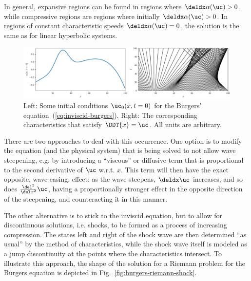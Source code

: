 In general, expansive regions can be found in regions where $\deldx \alpha(\uc)
> 0$, while compressive regions are regions where initially $\deldx \alpha(\uc) > 0$. In regions of
constant characteristic speeds $\deldx \alpha(\uc) = 0$, the solution is the same as for linear
hyperbolic systems.




\begin{figure}[H]
    \centering
    \includegraphics[width=\linewidth]{./figures/FV/burgers_characteristics.pdf}%
    \caption[Characteristics for the Burgers equation]{
    Left: Some initial conditions $\uc_0(x, t=0)$ for the Burgers'
equation~(\ref{eq:inviscid-burgers}). Right: The corresponding characteristics that satisfy
$\DDT{x} = \uc$. All units are arbitrary.
}
    \label{fig:burgers-characteristics}
\end{figure}


There are two approaches to deal with this occurrence. One option is to modify the equation (and
the physical system) that is being solved to not allow wave steepening, e.g. by introducing a
``viscous'' or diffusive term that is proportional to the second derivative of $\uc$ w.r.t. $x$.
This term will then have the exact opposite, wave-easing, effect: as the wave steepens, $\deldx
\uc$ increases, and so does $\frac{\del^2}{\del x^2} \uc$, having a proportionally stronger effect
in the opposite direction of the steepening, and counteracting it in this manner.

The other alternative is to stick to the inviscid equation, but to allow for discontinuous
solutions, i.e. shocks, to be formed as a process of increasing compression. The states left and
right of the shock wave are then determined ``as usual'' by the method of characteristics, while
the shock wave itself is modeled as a jump discontinuity at the points where the characteristics
intersect. To illustrate this approach, the shape of the solution for a Riemann problem for the
Burgers equation is depicted in Fig.~\ref{fig:burgers-riemann-shock}.

